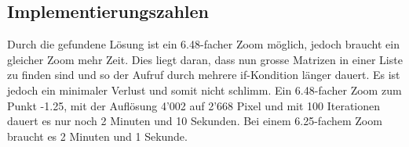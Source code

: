 \subsection{Implementierungszahlen}
Durch die gefundene Lösung ist ein 6.48-facher Zoom möglich, jedoch braucht ein gleicher Zoom mehr Zeit. Dies liegt daran, dass nun grosse Matrizen in einer Liste zu finden sind und so der Aufruf durch mehrere if-Kondition länger dauert. Es ist jedoch ein minimaler Verlust und somit nicht schlimm. Ein 6.48-facher Zoom zum Punkt -1.25, mit der Auflösung 4'002 auf 2'668 Pixel und mit 100 Iterationen dauert es nur noch 2 Minuten und 10 Sekunden. Bei einem 6.25-fachem Zoom braucht es 2 Minuten und 1 Sekunde.
